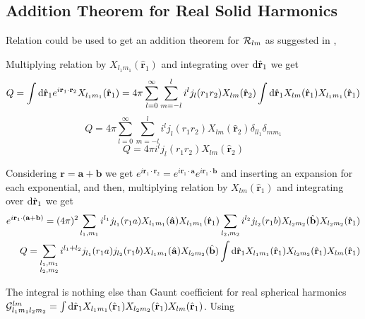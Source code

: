\subsection[Addition Theorem ...]{Addition Theorem for Real Solid Harmonics}
\par{Relation  could be used to get an addition theorem for
  $\mathcal{R}_{lm}$ as suggested in \citep{Chakrabarti95},\citep{Deb83}}
\par{Multiplying relation  by $X_{l_1m_1}(\hat{\bm{r}}_1)$ and
  integrating over $\text{d} \hat{{\bf r}}_1$ we get}
\begin{equation*}
Q=\int \text{d} \hat{{\bf r}}_1
e^{i{\bf r}_1\cdot{\bf r}_2}X_{l_1m_1}(\hat{{\bf r}}_1)=4\pi\sum_{l=0}^{\infty}\sum_{m=-l}^{l}i^lj_l(r_1r_2)X_{lm}(\hat{{\bf r}}_2)\int \text{d} \hat{{\bf r}}_1
X_{lm}(\hat{{\bf r}}_1)X_{l_1m_1}(\hat{{\bf r}}_1)
\end{equation*}
\begin{equation*}
Q=4\pi\sum_{l=0}^{\infty}\sum_{m=-l}^{l}i^lj_l(r_1r_2)X_{lm}(\hat{\bm{r}}_2)\delta_{ll_1}\delta_{mm_1}
\end{equation*}
\begin{equation}
\label{part1}
Q=4\pi i^lj_l(r_1r_2)X_{lm}(\hat{\bm{r}}_2)
\end{equation}
\par{Considering $\bm{r}=\bm{a}+\bm{b}$ we get
$e^{i\bm{r}_1\cdot\bm{r}_2}=e^{i\bm{r}_1\cdot\bm{a}}e^{i\bm{r}_1\cdot\bm{b}}$
and inserting an expansion  for each exponential, and then,
multiplying relation by $X_{lm}(\hat{\bm{r}}_1)$ and integrating over $\text{d} \hat{{\bf r}}_1$ we get}
\begin{equation*}
\begin{split}
e^{i{\bf r}_1\cdot({\bf a}+{\bf b})}=(4\pi)^2\sum_{l_1,m_1}i^{l_1}j_{l_1}(r_1a)X_{l_1m_1}(\hat{{\bf a}})X_{l_1m_1}(\hat{{\bf r}}_1)\sum_{l_2,m_2}i^{l_2}j_{l_2}(r_1b)X_{l_2m_2}(\hat{{\bf b}})X_{l_2m_2}(\hat{{\bf r}}_1)\\
Q=\sum_{\begin{subarray}{l}l_1,m_1\\
l_2,m_2
\end{subarray}
}i^{l_1+l_2}j_{l_1}(r_1a)j_{l_2}(r_1b)X_{l_1m_1}(\hat{{\bf a}})X_{l_2m_2}(\hat{{\bf b}})\int
\text{d} \hat{{\bf r}}_1 X_{l_1m_1}(\hat{{\bf r}}_1)X_{l_2m_2}(\hat{{\bf r}}_1)X_{lm}(\hat{{\bf r}}_1)
\end{split}
\end{equation*}
\par{The integral is nothing else than Gaunt coefficient for real spherical
  harmonics $\mathcal{G}_{l_1m_1l_2m_2}^{lm}=\int \text{d} \hat{{\bf r}}_1
  X_{l_1m_1}(\hat{{\bf r}}_1)X_{l_2m_2}(\hat{{\bf r}}_1)X_{lm}(\hat{{\bf r}}_1)$.
  Using }
